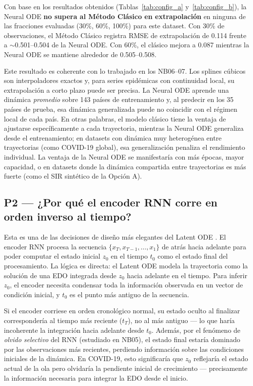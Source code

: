 \documentclass[12pt,a4paper]{article}
\begin{document}
Con base en los resultados obtenidos (Tablas~\ref{tab:config_a}
y~\ref{tab:config_b}), la Neural ODE \textbf{no supera al Método Clásico en
extrapolación} en ninguna de las fracciones evaluadas (30\%, 60\%, 100\%) para
este dataset.
Con 30\% de observaciones, el Método Clásico registra RMSE de extrapolación de
0.114 frente a $\sim$0.501--0.504 de la Neural ODE.
Con 60\%, el clásico mejora a 0.087 mientras la Neural ODE se mantiene
alrededor de 0.505--0.508.

Este resultado es coherente con lo trabajado en los NB06--07.
Los splines cúbicos son interpoladores exactos y, para series epidémicas con
continuidad local, su extrapolación a corto plazo puede ser precisa.
La Neural ODE aprende una dinámica \emph{promedio} sobre 143 países de
entrenamiento y, al predecir en los 35 países de prueba, esa dinámica
generalizada puede no coincidir con el régimen local de cada país.
En otras palabras, el modelo clásico tiene la ventaja de ajustarse
específicamente a cada trayectoria, mientras la Neural ODE generaliza desde el
entrenamiento; en datasets con dinámica muy heterogénea entre trayectorias
(como COVID-19 global), esa generalización penaliza el rendimiento individual.
La ventaja de la Neural ODE se manifestaría con más épocas, mayor capacidad, o
en datasets donde la dinámica compartida entre trayectorias es más fuerte
(como el SIR sintético de la Opción A).

\subsection{P2 — ¿Por qué el encoder RNN corre en orden inverso al tiempo?}
\label{sec:p2}

Esta es una de las decisiones de diseño más elegantes del Latent ODE
\cite{rubanova2019}.
El encoder RNN procesa la secuencia $\{x_T, x_{T-1}, \ldots, x_1\}$ de atrás
hacia adelante para poder computar el estado inicial $z_0$ en el tiempo $t_0$
como el estado final del procesamiento.
La lógica es directa: el Latent ODE modela la trayectoria como la solución de
una EDO integrada desde $z_0$ hacia adelante en el tiempo.
Para inferir $z_0$, el encoder necesita condensar toda la información observada
en un vector de condición inicial, y $t_0$ es el punto más antiguo de la
secuencia.

Si el encoder corriese en orden cronológico normal, su estado oculto al
finalizar correspondería al tiempo más reciente ($t_T$), no al más antiguo ---
lo que haría incoherente la integración hacia adelante desde $t_0$.
Además, por el fenómeno de \emph{olvido selectivo} del RNN (estudiado en NB05),
el estado final estaría dominado por las observaciones más recientes, perdiendo
información sobre las condiciones iniciales de la dinámica.
En COVID-19, esto significaría que $z_0$ reflejaría el estado actual de la ola
pero olvidaría la pendiente inicial de crecimiento --- precisamente la
información necesaria para integrar la EDO desde el inicio.
\end{document}
